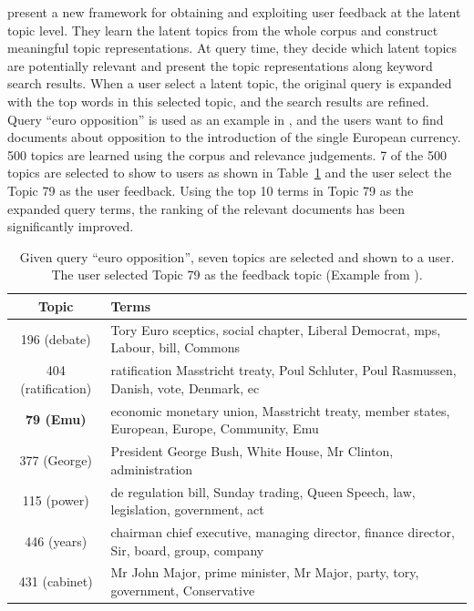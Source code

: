 \citet{Andrzejewski-2011} present a new framework for obtaining and
exploiting user feedback at the latent topic level. They learn the
latent topics from the whole corpus and construct meaningful topic
representations. At query time, they decide which latent topics are
potentially relevant and present the topic representations along
keyword search results. When a user select a latent topic, the
original query is expanded with the top words in this selected topic,
and the search results are refined. 
Query ``euro opposition'' is used as an example in \citet{Andrzejewski-2011},
and the users want to find documents about opposition to the introduction of
the single European currency. 500 topics are learned using the corpus and relevance
judgements. 7 of the 500 topics are selected to show to users as shown in
Table~\ref{tab:topic-feedback} and the user select the Topic 79 as the user feedback.
Using the top 10 terms in Topic 79 as the expanded query terms, the ranking of
the relevant documents has been significantly improved.

\begin{table}[!tp]
\begin{center}
\footnotesize
\setlength\tabcolsep{3pt}
\begin{tabular}{c  p{9cm} } \hline
Topic & Terms \\ \hline \hline
196 (debate) & Tory Euro sceptics, social chapter, Liberal Democrat, mps, Labour, bill, Commons \\
404 (ratification) & ratification Masstricht treaty, Poul Schluter, Poul Rasmussen, Danish, vote, Denmark, ec \\
\textbf{79 (Emu)} & economic monetary union, Masstricht treaty, member states, European, Europe, Community, Emu \\
377 (George) & President George Bush, White House, Mr Clinton, administration \\
115 (power) & de regulation bill, Sunday trading, Queen Speech, law, legislation, government, act \\
446 (years) & chairman chief executive, managing director, finance director, Sir, board, group, company \\
431 (cabinet) & Mr John Major, prime minister, Mr Major, party, tory, government, Conservative \\
\hline
\end{tabular}
\caption{Given query ``euro opposition'', seven topics are selected and shown to a user. The user selected Topic 79
as the feedback topic (Example from \citet{Andrzejewski-2011}).}
\label{tab:topic-feedback}
\end{center}
\end{table}

